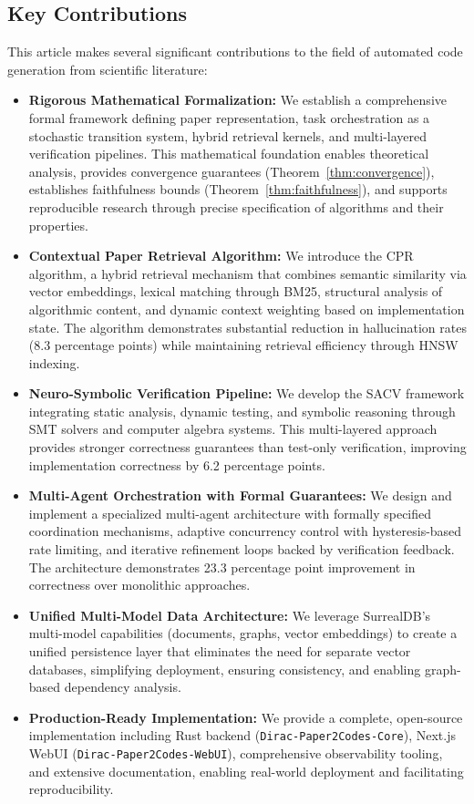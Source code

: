 \documentclass{ieeeaccess}
\begin{document}
\subsection{Key Contributions}
This article makes several significant contributions to the field of automated code generation from scientific literature:

\begin{itemize}
\item \textbf{Rigorous Mathematical Formalization:} We establish a comprehensive formal framework defining paper representation, task orchestration as a stochastic transition system, hybrid retrieval kernels, and multi-layered verification pipelines. This mathematical foundation enables theoretical analysis, provides convergence guarantees (Theorem~\ref{thm:convergence}), establishes faithfulness bounds (Theorem~\ref{thm:faithfulness}), and supports reproducible research through precise specification of algorithms and their properties.

\item \textbf{Contextual Paper Retrieval Algorithm:} We introduce the CPR algorithm, a hybrid retrieval mechanism that combines semantic similarity via vector embeddings, lexical matching through BM25, structural analysis of algorithmic content, and dynamic context weighting based on implementation state. The algorithm demonstrates substantial reduction in hallucination rates (8.3 percentage points) while maintaining retrieval efficiency through HNSW indexing.

\item \textbf{Neuro-Symbolic Verification Pipeline:} We develop the SACV framework integrating static analysis, dynamic testing, and symbolic reasoning through SMT solvers and computer algebra systems. This multi-layered approach provides stronger correctness guarantees than test-only verification, improving implementation correctness by 6.2 percentage points.

\item \textbf{Multi-Agent Orchestration with Formal Guarantees:} We design and implement a specialized multi-agent architecture with formally specified coordination mechanisms, adaptive concurrency control with hysteresis-based rate limiting, and iterative refinement loops backed by verification feedback. The architecture demonstrates 23.3 percentage point improvement in correctness over monolithic approaches.

\item \textbf{Unified Multi-Model Data Architecture:} We leverage SurrealDB's multi-model capabilities (documents, graphs, vector embeddings) to create a unified persistence layer that eliminates the need for separate vector databases, simplifying deployment, ensuring consistency, and enabling graph-based dependency analysis.

\item \textbf{Production-Ready Implementation:} We provide a complete, open-source implementation including Rust backend (\texttt{Dirac-Paper2Codes-Core}), Next.js WebUI (\texttt{Dirac-Paper2Codes-WebUI}), comprehensive observability tooling, and extensive documentation, enabling real-world deployment and facilitating reproducibility.
\end{itemize}
\end{document}
